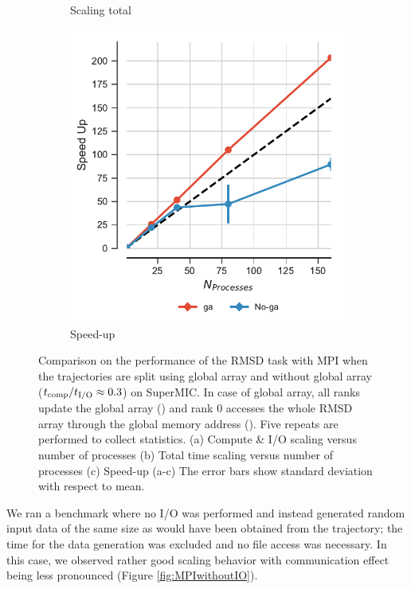 \begin{figure}[ht!]
\begin{subfigure}{.3\textwidth}
  \caption{Scaling total}
  \label{fig:MPItottime-chain-reader}
\end{subfigure}
\hfill
\begin{subfigure}{.3\textwidth}
  \includegraphics[width=\linewidth]{figures/Comparison_Speed_UP_traj_splitting-SuperMIC.pdf}
  \caption{Speed-up}
  \label{fig:MPIspeedup-chain-reader}
\end{subfigure}

\caption{Comparison on the performance of the RMSD task with MPI when the trajectories are split using global array and without global array (${t}_{\text{comp}}/{t}_{\text{I/O}} \approx 0.3$) on SuperMIC.
In case of global array, all ranks update the global array () and rank 0 accesses the whole RMSD array through the global memory address ().
Five repeats are performed to collect statistics. (a) Compute \& I/O scaling versus number of processes (b) Total time scaling versus number of processes (c) Speed-up (a-c) The error bars show standard deviation with respect to mean.}
\label{fig:MPIwithIO-split-SuperMIC}
\end{figure}


We ran a benchmark where no I/O was performed and instead generated random input data of the same size as would have been obtained from the trajectory; the time for the data generation was excluded and no file access was necessary. 
In this case, we observed rather good scaling behavior with communication effect being less pronounced (Figure \ref{fig:MPIwithoutIO}).


